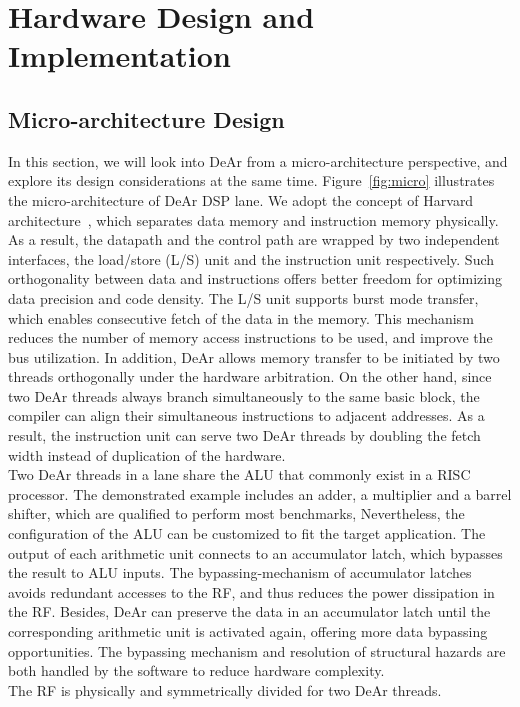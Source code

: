 \section{Hardware Design and Implementation}
\subsection{Micro-architecture Design}
In this section, we will look into DeAr from a micro-architecture perspective, and explore its design considerations at the same time.
Figure~\ref{fig:micro} illustrates the micro-architecture of DeAr DSP lane.
We adopt the concept of Harvard architecture~\cite{harvard}, 
which separates data memory and instruction memory physically.
As a result, the datapath and the control path are wrapped by two independent interfaces, the load/store (L/S) unit and the instruction unit respectively.
Such orthogonality between data and instructions offers better freedom for optimizing data precision and code density.
The L/S unit supports burst mode transfer, which enables consecutive fetch of the data in the memory.
This mechanism reduces the number of memory access instructions to be used, 
and improve the bus utilization.
In addition, DeAr allows memory transfer to be initiated by two threads orthogonally under the hardware arbitration.
On the other hand, since two DeAr threads always branch simultaneously to the same basic block, 
the compiler can align their simultaneous instructions to adjacent addresses.
As a result, the instruction unit can serve two DeAr threads by doubling the fetch width instead of duplication of the hardware.
\\\indent
Two DeAr threads in a lane share the ALU that commonly exist in a RISC processor.
The demonstrated example includes an adder, a multiplier and a barrel shifter, which are qualified to perform most benchmarks,
Nevertheless, the configuration of the ALU can be customized to fit the target application.
The output of each arithmetic unit connects to an accumulator latch, 
which bypasses the result to ALU inputs.
The bypassing-mechanism of accumulator latches avoids redundant accesses to the RF, 
and thus reduces the power dissipation in the RF.
Besides, DeAr can preserve the data in an accumulator latch until the corresponding arithmetic unit is activated again, 
offering more data bypassing opportunities.
The bypassing mechanism and resolution of structural hazards are both handled by the software to reduce hardware complexity.
\\\indent
The RF is physically and symmetrically divided for two DeAr threads.
